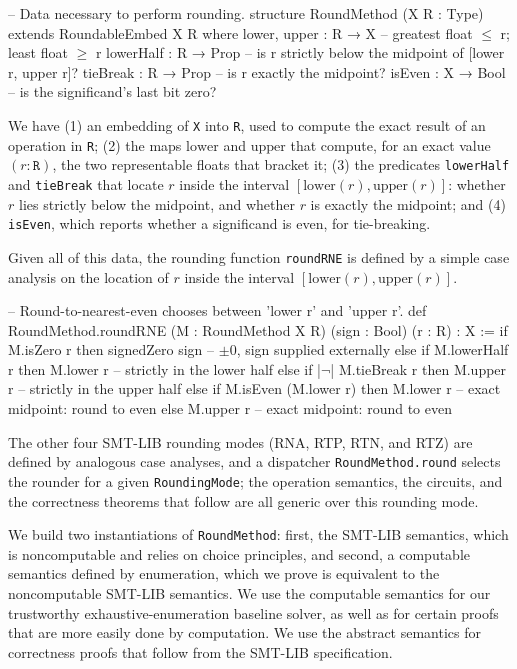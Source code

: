 \begin{lean4}[fontsize=\small]
-- Data necessary to perform rounding.
structure RoundMethod (X R : Type) extends RoundableEmbed X R where
  lower, upper : R → X      -- greatest float $\leq$ r; least float $\geq$ r
  lowerHalf    : R → Prop   -- is r strictly below the midpoint of [lower r, upper r]?
  tieBreak     : R → Prop   -- is r exactly the midpoint?
  isEven       : X → Bool   -- is the significand's last bit zero?
\end{lean4}
\noindent We have (1) an embedding of \texttt{X} into \texttt{R}, used to compute the exact result of an operation in \texttt{R};
(2) the maps $\mathrm{lower}$ and $\mathrm{upper}$ that compute, for an exact value $(r : \texttt{R})$, the two representable floats that bracket it;
(3) the predicates \texttt{lowerHalf} and \texttt{tieBreak} that locate $r$ inside the interval $[\mathrm{lower}(r), \mathrm{upper}(r)]$:
whether $r$ lies strictly below the midpoint, and whether $r$ is exactly the midpoint;
and (4) \texttt{isEven}, which reports whether a significand is even, for tie-breaking.

Given all of this data, the rounding function \texttt{roundRNE} is defined by a
simple case analysis on the location of $r$ inside the interval
$[\mathrm{lower}(r), \mathrm{upper}(r)]$.
\begin{lean4}[fontsize=\small, escapeinside=||]
-- Round-to-nearest-even chooses between 'lower r' and 'upper r'.
def RoundMethod.roundRNE (M : RoundMethod X R) (sign : Bool) (r : R) : X :=
  if      M.isZero r            then signedZero sign  -- $\pm$0, sign supplied externally
  else if M.lowerHalf r         then M.lower r        -- strictly in the lower half
  else if |$\lnot$| M.tieBreak r        then M.upper r        -- strictly in the upper half
  else if M.isEven (M.lower r)  then M.lower r        -- exact midpoint: round to even
  else                               M.upper r        -- exact midpoint: round to even
\end{lean4}
\noindent The other four SMT-LIB rounding modes (RNA, RTP, RTN, and RTZ) are defined by analogous case analyses,
and a dispatcher \texttt{RoundMethod.round} selects the rounder for a given \texttt{RoundingMode};
the operation semantics, the circuits, and the correctness theorems that follow are all generic over this rounding mode.

We build two instantiations of \texttt{RoundMethod}:
first, the SMT-LIB semantics, which is noncomputable and relies on choice principles,
and second, a computable semantics defined by enumeration,
which we prove is equivalent to the noncomputable SMT-LIB semantics.
We use the computable semantics for our trustworthy exhaustive-enumeration baseline solver,
as well as for certain proofs that are more easily done by computation.
We use the abstract semantics for correctness proofs that follow from the SMT-LIB specification.

